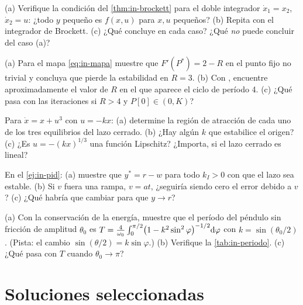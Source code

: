 \begin{problema}\label{prob:in-brockett}
(a) Verifique la condición del \cref{thm:in-brockett} para el doble integrador $\dot x_1=x_2$, $\dot x_2=u$: ¿todo $y$ pequeño es $f(x,u)$ para $x,u$ pequeños? (b) Repita con el integrador de Brockett. (c) ¿Qué concluye en cada caso? ¿Qué \emph{no} puede concluir del caso (a)?
\end{problema}

\begin{problema}\label{prob:in-mapa}
\etiquetaM{} (a) Para el mapa \eqref{eq:in-mapa} muestre que $F'(P^*)=2-R$ en el punto fijo no trivial y concluya que pierde la estabilidad en $R=3$. (b) Con , encuentre aproximadamente el valor de $R$ en el que aparece el ciclo de período 4. (c) ¿Qué pasa con las iteraciones si $R>4$ y $P[0]\in(0,K)$?
\end{problema}

\begin{problema}\label{prob:in-cubico}
\etiquetaM{} Para $\dot x=x+u^3$ con $u=-kx$: (a) determine la región de atracción de cada uno de los tres equilibrios del lazo cerrado. (b) ¿Hay algún $k$ que estabilice el origen? (c) ¿Es $u=-(kx)^{1/3}$ una función Lipschitz? ¿Importa, si el lazo cerrado es lineal?
\end{problema}

\begin{problema}\label{prob:in-pid}
En el \cref{ej:in-pid}: (a) muestre que $y^*=r-w$ para todo $k_I>0$ con que el lazo sea estable. (b) Si $v$ fuera una rampa, $v=at$, ¿seguiría siendo cero el error debido a $v$? (c) ¿Qué habría que cambiar para que $y\to r$?
\end{problema}

\begin{problema}\label{prob:in-periodo}
\etiquetaEstrella{} (a) Con la conservación de la energía, muestre que el período del péndulo sin fricción de amplitud $\theta_0$ es $T=\frac{4}{\omega_0}\int_0^{\pi/2}\bigl(1-k^2\sin^2\varphi\bigr)^{-1/2}\mathrm{d}\varphi$ con $k=\sin(\theta_0/2)$. (Pista: el cambio $\sin(\theta/2)=k\sin\varphi$.) (b) \etiquetaM{} Verifique la \cref{tab:in-periodo}. (c) ¿Qué pasa con $T$ cuando $\theta_0\to\pi$?
\end{problema}

\section{Soluciones seleccionadas}

